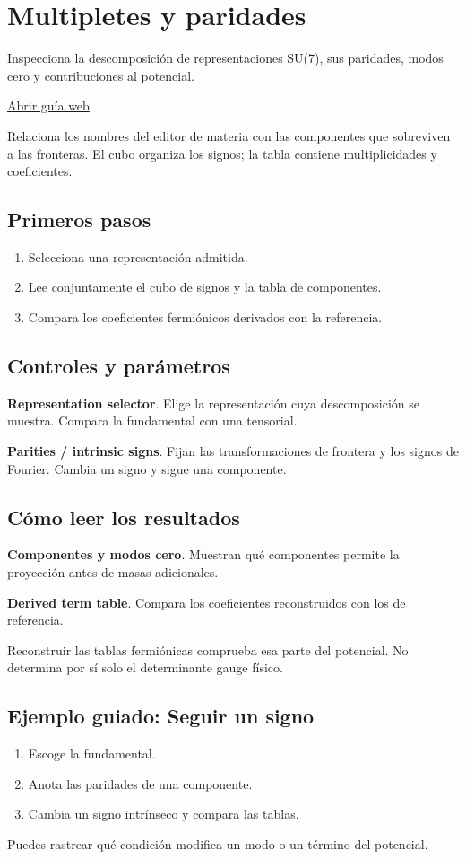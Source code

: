 \documentclass[11pt,a4paper]{article}
\begin{document}
\section{Multipletes y paridades}
Inspecciona la descomposición de representaciones SU(7), sus paridades, modos cero y contribuciones al potencial.

\href{https://karlesmarin.github.io/ghu-explorer/guide/es/multiplets/index.html}{Abrir guía web}

Relaciona los nombres del editor de materia con las componentes que sobreviven a las fronteras. El cubo organiza los signos; la tabla contiene multiplicidades y coeficientes.
\subsection*{Primeros pasos}
\begin{enumerate}
\item Selecciona una representación admitida.
\item Lee conjuntamente el cubo de signos y la tabla de componentes.
\item Compara los coeficientes fermiónicos derivados con la referencia.
\end{enumerate}
\subsection*{Controles y parámetros}
\textbf{Representation selector}. Elige la representación cuya descomposición se muestra. Compara la fundamental con una tensorial.

\textbf{Parities / intrinsic signs}. Fijan las transformaciones de frontera y los signos de Fourier. Cambia un signo y sigue una componente.

\subsection*{Cómo leer los resultados}
\textbf{Componentes y modos cero}. Muestran qué componentes permite la proyección antes de masas adicionales.

\textbf{Derived term table}. Compara los coeficientes reconstruidos con los de referencia.

Reconstruir las tablas fermiónicas comprueba esa parte del potencial. No determina por sí solo el determinante gauge físico.
\subsection*{Ejemplo guiado: Seguir un signo}
\begin{enumerate}
\item Escoge la fundamental.
\item Anota las paridades de una componente.
\item Cambia un signo intrínseco y compara las tablas.
\end{enumerate}
Puedes rastrear qué condición modifica un modo o un término del potencial.
\end{document}
